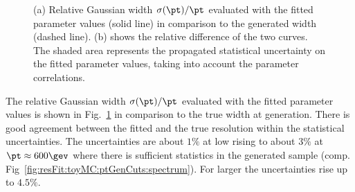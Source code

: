 \documentclass[a4paper]{cmspaper} %
\begin{document}
\begin{figure}[ht]
  \begin{center}
     
  \end{center}
  \caption{(a) Relative Gaussian width $\sigma(\pt)/\pt$ evaluated with the fitted
    parameter values (solid line) in comparison to the generated width
    (dashed line).  (b) shows
    the relative difference of the two curves. The shaded area represents the propagated statistical
    uncertainty on the fitted parameter values, taking into account the
    parameter correlations.}
  \label{fig:resFit:toyMC:ptGenCuts:sigma}
\end{figure}

The relative Gaussian width $\sigma(\pt)/\pt$ evaluated with the fitted
parameter values is shown in Fig.~\ref{fig:resFit:toyMC:ptGenCuts:sigma}
in comparison to the true width at generation.
There is good agreement between the fitted and the true resolution
within the statistical uncertainties.
The uncertainties are about $1\%$ at low \pt rising to
about $3\%$ at $\pt \approx 600\gev$ where there is sufficient statistics in
the generated sample (comp. Fig~\ref{fig:resFit:toyMC:ptGenCuts:spectrum}).
For larger \pt the uncertainties rise up to $4.5\%$.
\end{document}
